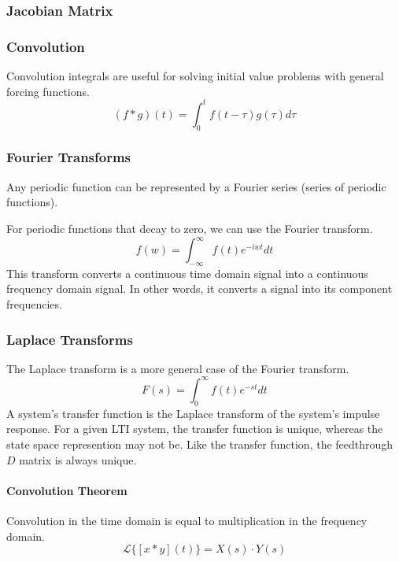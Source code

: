 \documentclass[../notes.tex]{subfiles}
\begin{document}
\subsubsection{Jacobian Matrix} \label{sec:jacobian}

\subsubsection{Convolution}
Convolution integrals are useful for solving initial value problems with general forcing functions.
\begin{equation}
    (f * g)(t) = \int_{0}^{t} f(t-\tau)g(\tau)d\tau
\end{equation}

\subsubsection{Fourier Transforms}
Any periodic function can be represented by a Fourier series (series of periodic functions).

For periodic functions that decay to zero, we can use the Fourier transform.
\begin{equation}
    f(w) = \int_{-\infty}^{\infty}f(t)e^{-iwt}dt
\end{equation}
This transform converts a continuous time domain signal into a continuous frequency domain signal. In other words, it converts a signal into its component frequencies.

\subsubsection{Laplace Transforms}
The Laplace transform is a more general case of the Fourier transform.
\begin{equation}
    F(s) = \int_{0}^{\infty}f(t)e^{-st}dt
\end{equation}
A system's transfer function is the Laplace transform of the system's impulse response. For a given LTI system, the transfer function is unique, whereas the state space represention may not be. Like the transfer function, the feedthrough $D$ matrix is always unique.

\paragraph{Convolution Theorem}
Convolution in the time domain is equal to multiplication in the frequency domain.
\begin{equation}
    \mathcal{L}\{[x * y](t)\} = X(s) \cdot Y(s)
\end{equation}
\end{document}

